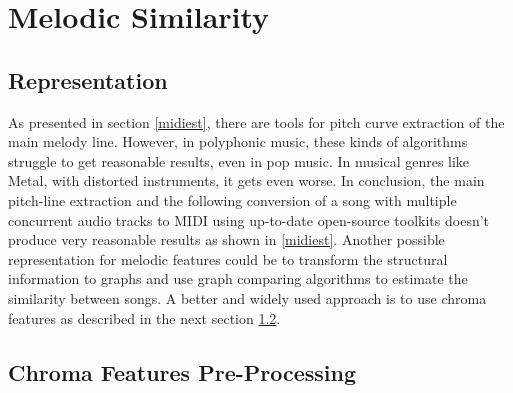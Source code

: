 \newpage

\section{Melodic Similarity}\label{melsimc}

\subsection{Representation}

As presented in section \ref{midiest}, there are tools for pitch curve extraction of the main melody line. However, in polyphonic music, these kinds of algorithms struggle to get reasonable results, even in pop music. In musical genres like Metal, with distorted instruments, it gets even worse. In conclusion, the main pitch-line extraction and the following conversion of a song with multiple concurrent audio tracks to MIDI using up-to-date open-source toolkits doesn't produce very reasonable results as shown in \ref{midiest}.
Another possible representation for melodic features could be to transform the structural information to graphs and use graph comparing algorithms to estimate the similarity between songs. \cite{graph1} 
A better and widely used approach is to use chroma features as described in the next section \ref{chromafeat}.

\subsection{Chroma Features Pre-Processing}\label{chromafeat}

